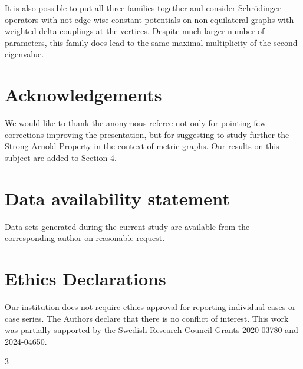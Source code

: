 \documentclass{amsart}
\theoremstyle{definition}
\theoremstyle{remark}
\numberwithin{equation}{section}
\begin{document}
{It is also possible to put all three families together and consider Schr\"odinger operators with not edge-wise constant potentials on
non-equilateral graphs with weighted delta couplings at the vertices. Despite much larger number of parameters, this family does  lead to 
the same maximal multiplicity
 of the second eigenvalue.
 
 

 \section*{Acknowledgements}
 
 We would like to thank the anonymous referee not only  for pointing few corrections improving the presentation, but for suggesting
 to study further the Strong Arnold Property in the context of metric graphs. Our results on this subject are added to Section 4. 
 
 
 
 
 \section*{Data availability statement}
 
 Data sets generated during the current study are available from the corresponding author on reasonable request.
 
 \section*{Ethics Declarations}
 
 Our institution does not require ethics approval for reporting individual cases or case
series. The Authors declare that there is no conflict of interest.
This work was partially supported by the Swedish Research Council Grants 2020-03780 and 2024-04650.

\begin{thebibliography}{3}




\end{thebibliography}}
\end{document}
